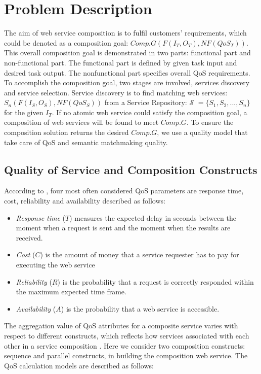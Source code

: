 \documentclass{IEEEtran}
\begin{document}
\section{Problem Description}\label{problemDes}

The aim of web service composition is to fulfil customers' requirements, which could be denoted as a composition goal: $Comp.G(F(I_{T}, O_{T}), NF(QoS_{T}))$. This overall composition goal is demonstrated in two parts: functional part and non-functional part. The functional part is defined by given task input and desired task output. The nonfunctional part specifies overall QoS requirements. To accomplish the composition goal, two stages are involved, services discovery and service selection. Service discovery is to find matching web services: $S_{n}(F(I_{S}, O_{S}), NF(QoS_{S}))$ from a Service Repository: $\mathcal{S}$ $=  \{S_{1}, S_{2},..., S_{n} \}$ for the given $I_{T}$. If no atomic web service could satisfy the composition goal, a composition of web services will be found to meet $Comp.G$. To ensure the composition solution returns the desired $Comp.G$, we use a quality model that take care of QoS and semantic matchmaking quality.

\subsection{Quality of Service and Composition Constructs}\label{Quality of Service and Composition Constructs}
According to \cite{zeng2003quality}, four most often considered QoS parameters are response time, cost, reliability and availability described as follows:
\begin{itemize}
\item \textit{Response time} ($T$) measures the expected delay in seconds between the moment when a request is sent and the moment when the results are received.
\item \textit{Cost} ($C$) is the amount of money that a service requester has to pay for executing the web service
\item \textit{Reliability} ($R$) is the probability that a request is correctly responded within the maximum expected time frame.
\item \textit{Availability} ($A$) is the probability that a web service is accessible.
\end{itemize}
The aggregation value of QoS attributes for a composite service varies with respect to different constructs, which reflects how services associated with each other in a service composition \cite{zeng2003quality}. Here we consider two composition constructs: sequence and parallel constructs, in building the composition web service. The QoS calculation models are described as follows:
\end{document}
